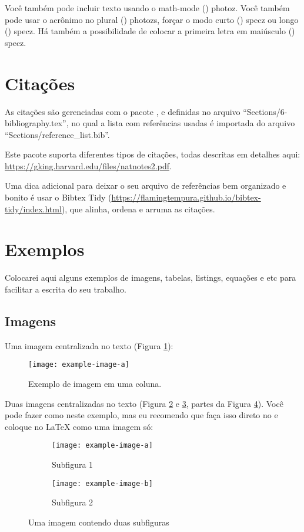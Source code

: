     Você também pode incluir texto usando o math-mode () \ac{photoz}. Você também pode usar o acrônimo no plural () \acp{photoz}, forçar o modo curto () \acs{specz} ou longo () \acl{specz}. Há também a possibilidade de colocar a primeira letra em maiúsculo () \Ac{specz}.

  \section{Citações}
    As citações são gerenciadas com o pacote , e definidas no arquivo ``Sections/6-bibliography.tex'', no qual a lista com referências usadas é importada do arquivo ``Sections/reference\_list.bib''. 

    Este pacote suporta diferentes tipos de citações, todas descritas em detalhes aqui: \url{https://gking.harvard.edu/files/natnotes2.pdf}.

    Uma dica adicional para deixar o seu arquivo de referências bem organizado e bonito é usar o Bibtex Tidy (\url{https://flamingtempura.github.io/bibtex-tidy/index.html}), que alinha, ordena e arruma as citações.

  \section{Exemplos}
    Colocarei aqui alguns exemplos de imagens, tabelas, listings, equações e etc para facilitar a escrita do seu trabalho.

    \subsection{Imagens}
    Uma imagem centralizada no texto (Figura \ref{fig:ex_1col}):
    \begin{figure}[h]
      \centering
      \texttt{[image: example-image-a]}
      \caption{Exemplo de imagem em uma coluna.}
      \label{fig:ex_1col}
    \end{figure}

    Duas imagens centralizadas no texto (Figura \ref{fig:sub_1} e \ref{fig:sub_2}, partes da Figura \ref{fig:ex_2cols}). Você pode fazer como neste exemplo, mas eu recomendo que faça isso direto no  e coloque no \LaTeX{} como uma imagem só:
    \begin{figure}[h]
      \centering
      \begin{subfigure}{.45\textwidth}
        \centering
        \texttt{[image: example-image-a]}
        \caption{Subfigura 1}
        \label{fig:sub_1}
      \end{subfigure}%
      \begin{subfigure}{.45\textwidth}
        \centering
        \texttt{[image: example-image-b]}
        \caption{Subfigura 2}
        \label{fig:sub_2}
      \end{subfigure}
      \caption{Uma imagem contendo duas subfiguras}
      \label{fig:ex_2cols}
    \end{figure}


